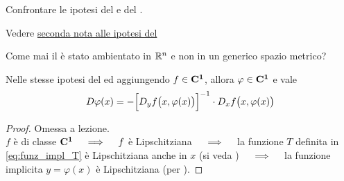 \begin{exercise}
	Confrontare le ipotesi del  e del .
	\begin{solution}
		Vedere \hyperlink{note:teo_funz_impl_note_ipot1}{seconda nota alle ipotesi del }
	\end{solution}
\end{exercise}
\begin{exercise}
	Come mai il  è stato ambientato in $\mathbb{R}^n$ e non in un generico spazio metrico?
\end{exercise}
\begin{theorem}
	\label{teo:diff_primo_funz_impl}
	Nelle stesse ipotesi del  ed aggiungendo $f \in \mathbf{C^{1}}$, allora $\varphi \in \mathbf{C^{1}}$ e vale
	\begin{equation}
		\label{eq:diff_primo_funz_impl}
		D\varphi(x) = - \Bigl[ D_yf \bigl( x, \varphi(x) \bigr) \Bigr]^{-1} \cdot D_xf \bigl( x, \varphi(x) \bigr)
	\end{equation}
	\begin{proof}
		Omessa a lezione.\\
		\cbstart
		$f$ è di classe $\mathbf{C^{1}} \quad \implies \quad f$ è Lipschitziana $\quad \implies \quad$ la funzione $T$ definita in \cref{eq:funz_impl_T} è Lipschitziana anche in $x$ (si veda ) $\quad \implies \quad$ la funzione implicita $y = \varphi(x)$ è Lipschitziana (per ).


\end{proof}
\end{theorem}
